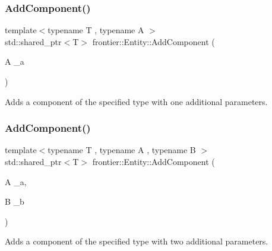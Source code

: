\subsubsection{\texorpdfstring{Add\+Component()}{AddComponent()}\hspace{0.1cm}{\footnotesize\ttfamily [2/5]}}
{\footnotesize\ttfamily template$<$typename T , typename A $>$ \\
std\+::shared\+\_\+ptr$<$T$>$ frontier\+::\+Entity\+::\+Add\+Component (\begin{DoxyParamCaption}\item[{A}]{\+\_\+a }\end{DoxyParamCaption})\hspace{0.3cm}{\ttfamily [inline]}}



Adds a component of the specified type with one additional parameters. 

\mbox{\label{classfrontier_1_1_entity_a203192666b3d100e5cf2e0f4427e3d85}} 
\subsubsection{\texorpdfstring{Add\+Component()}{AddComponent()}\hspace{0.1cm}{\footnotesize\ttfamily [3/5]}}
{\footnotesize\ttfamily template$<$typename T , typename A , typename B $>$ \\
std\+::shared\+\_\+ptr$<$T$>$ frontier\+::\+Entity\+::\+Add\+Component (\begin{DoxyParamCaption}\item[{A}]{\+\_\+a,  }\item[{B}]{\+\_\+b }\end{DoxyParamCaption})\hspace{0.3cm}{\ttfamily [inline]}}



Adds a component of the specified type with two additional parameters. 

\mbox{\label{classfrontier_1_1_entity_ac1af2d9f16c04053a3370afdf08ce3ea}} 

